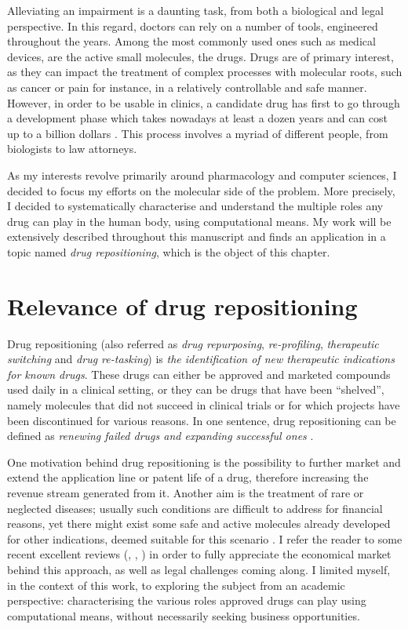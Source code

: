 Alleviating an impairment is a daunting task, from both a biological and legal perspective. In this regard, doctors can rely on a number of tools, engineered throughout the years. Among the most commonly used ones such as medical devices, are the active small molecules, the drugs. Drugs are of primary interest, as they can impact the treatment of complex processes with molecular roots, such as cancer or pain for instance, in a relatively controllable and safe manner. However, in order to be usable in clinics, a candidate drug has first to go through a development phase which takes nowadays at least a dozen years and can cost up to a billion dollars \citep{dimasi2001new}. This process involves a myriad of different people, from biologists to law attorneys.

As my interests revolve primarily around pharmacology and computer sciences, I decided to focus my efforts on the molecular side of the problem. More precisely, I decided to systematically characterise and understand the multiple roles any drug can play in the human body, using computational means. My work will be extensively described throughout this manuscript and finds an application in a topic named \emph{drug repositioning}, which is the object of this chapter.

\section{Relevance of drug repositioning}

Drug repositioning (also referred as \emph{drug repurposing}, \emph{re-profiling}, \emph{therapeutic switching} and \emph{drug re-tasking}) is \emph{the identification of new therapeutic indications for known drugs}. These drugs can either be approved and marketed compounds used daily in a clinical setting, or they can be drugs that have been ``shelved'', namely molecules that did not succeed in clinical trials or for which projects have been discontinued for various reasons. In one sentence, drug repositioning can be defined as \emph{renewing failed drugs and expanding successful ones} \citep{barratt2012drug}.

One motivation behind drug repositioning is the possibility to further market and extend the application line or patent life of a drug, therefore increasing the revenue stream generated from it. Another aim is the treatment of rare or neglected diseases; usually such conditions are difficult to address for financial reasons, yet there might exist some safe and active molecules already developed for other indications, deemed suitable for this scenario \citep{men20101}. I refer the reader to some recent excellent reviews (\cite{ashburn2004drug}, \cite{dudley2011exploiting}, \cite{hurle2013computational}) in order to fully appreciate the economical market behind this approach, as well as legal challenges coming along. I limited myself, in the context of this work, to exploring the subject from an academic perspective: characterising the various roles approved drugs can play using computational means, without necessarily seeking business opportunities.

